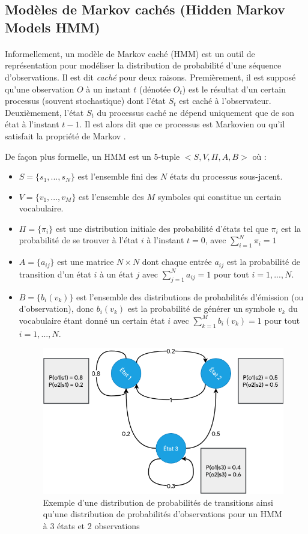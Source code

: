 \subsection{Modèles de Markov cachés (Hidden Markov Models HMM)}
\paragraph{}
Informellement, un modèle de Markov caché (HMM) est un outil de représentation pour modéliser la distribution de probabilité d'une séquence d'observations. Il est dit \textit{caché} pour deux raisons. Premièrement, il est supposé qu'une observation $O$ à un instant $t$ (dénotée $O_t$)  est le résultat d'un certain processus (souvent stochastique) dont l'état $S_t$ est caché à l'observateur. Deuxièmement, l'état $S_t$ du processus caché ne dépend uniquement que de son état à l'instant $t-1$. Il est alors dit que ce processus est Markovien ou qu'il satisfait la propriété de Markov \citep{hmm_intro,markov_process}.
\par De façon plus formelle, un HMM est un 5-tuple $<S,V,\Pi,A,B>$ \citep{hmm_formal} où :
\begin{itemize}
	\item $S = \lbrace s_1,...,s_N \rbrace$ est l'ensemble fini des $N$ états du processus sous-jacent.
	\item $V = \lbrace v_1,...,v_M \rbrace$ est l'ensemble des $M$ symboles qui constitue un certain vocabulaire.
	\item $\Pi = \lbrace \pi_i \rbrace$ est une distribution initiale des probabilité d'états tel que $\pi_i$ est la probabilité de se trouver à l'état $i$ à l'instant $t=0$, avec $\sum_{i=1}^{N} \pi_i = 1$ 
	\item $A=\lbrace a_{ij} \rbrace$ est une matrice $N \times N$ dont chaque entrée $a_{ij}$ est la probabilité de transition d'un état $i$ à un état $j$ avec $\sum_{j=1}^{N} a_{ij} = 1$ pour tout $i = 1,...,N$.
	\item $B=\lbrace b_i(v_k)\rbrace$ est l'ensemble des distributions de probabilités d'émission (ou d'observation), donc $b_i(v_k)$ est la probabilité de générer un symbole $v_k$ du vocabulaire étant donné un certain état $i$ avec $\sum_{k=1}^{M} b_{i}(v_k) = 1$ pour tout $i= 1,...,N$. 
	
	\begin{figure}[H]
		\centering
		\includegraphics[width=0.65\linewidth]{images/notions/hmm.png}
		\caption{Exemple d'une distribution de probabilités de transitions ainsi qu'une distribution de probabilités d'observations pour un HMM à 3 états et 2 observations}
		\label{hmm_process}
	\end{figure}
\end{itemize}
